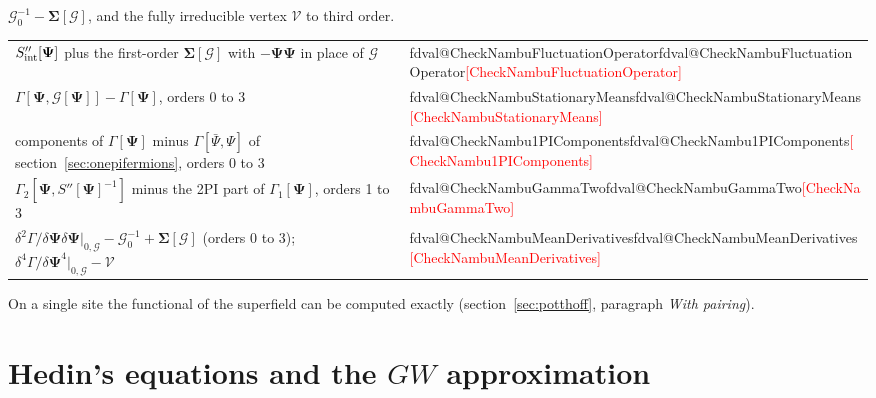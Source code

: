 \documentclass[11pt,a4paper]{article}
\makeatletter
\newcommand{\sfieldmean}{\boldsymbol\Psi}
\newcommand{\sfieldSigma}{\boldsymbol\Sigma}
\newcommand{\val}[1]{\ifcsname fdval@#1\endcsname\csname fdval@#1\endcsname\else\textcolor{red}{[#1]}\fi}
\makeatother
\begin{document}
$\mathcal G_0^{-1}-\sfieldSigma[\mathcal G]$, and the fully irreducible vertex $\mathcal V$ to third order.
\begin{result}
\begin{tabular}{@{}l@{\quad}l@{}}
$S_{\rm int}''[\sfieldmean]$ plus the first-order $\sfieldSigma[\mathcal G]$ with $-\sfieldmean\sfieldmean$ in place of $\mathcal G$ & \val{CheckNambuFluctuationOperator}\\
$\Gamma[\sfieldmean,\mathcal G[\sfieldmean]]-\Gamma[\sfieldmean]$, orders 0 to 3 & \val{CheckNambuStationaryMeans}\\
components of $\Gamma[\sfieldmean]$ minus $\Gamma[\bar\Psi,\Psi]$ of section~\ref{sec:onepifermions}, orders 0 to 3 & \val{CheckNambu1PIComponents}\\
$\Gamma_2[\sfieldmean,S''[\sfieldmean]^{-1}]$ minus the 2PI part of $\Gamma_1[\sfieldmean]$, orders 1 to 3 & \val{CheckNambuGammaTwo}\\
$\delta^2\Gamma/\delta\sfieldmean\delta\sfieldmean|_{0,\mathcal G}-\mathcal G_0^{-1}+\sfieldSigma[\mathcal G]$ (orders 0 to 3); $\delta^4\Gamma/\delta\sfieldmean^4|_{0,\mathcal G}-\mathcal V$ &
\val{CheckNambuMeanDerivatives}
\end{tabular}
\end{result}
On a single site the functional of the superfield can be computed exactly (section~\ref{sec:potthoff}, paragraph
\emph{With pairing}).

\section{Hedin's equations and the \texorpdfstring{$GW$}{GW} approximation}\label{sec:hedin}
\end{document}

